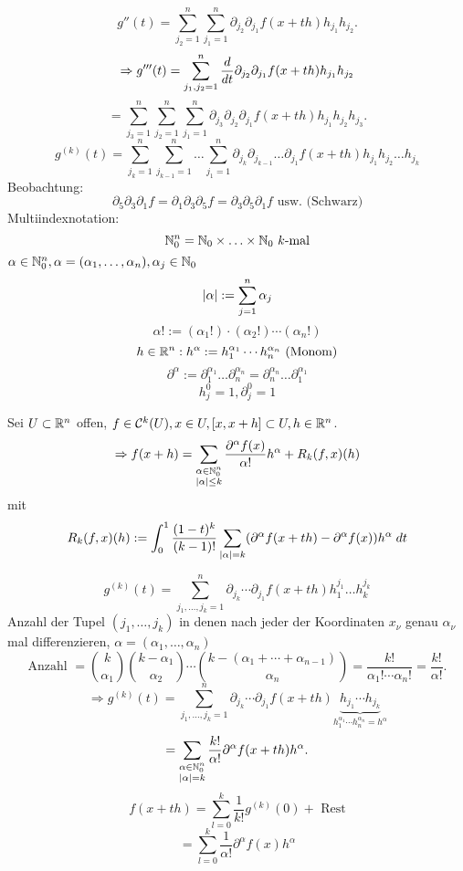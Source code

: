 \documentclass[../ana2.tex]{subfiles}
\begin{document}
\[ g''(t) = \sum_{j_2=1}^n \sum_{j_1=1}^n 
\partial_{j_2} \partial_{j_1} f(x + th) h_{j_1} h_{j_2}. \]
\[ \Rightarrow g'''(t) = \sum_{j_1,j_2 = 1}^n 
\ddx{t} \partial_{j_2} \partial_{j_1} f(x + th) h_{j_1} h_{j_2} \]
\[ = \sum_{j_3 = 1}^n\sum_{j_2 = 1}^n \sum_{j_1=1}^n \partial_{j_3} \partial_{j_2} \partial_{j_1}
f(x + th) h_{j_1} h_{j_2} h_{j_3}. \]
\[ g^{(k)}(t) = \sum_{j_k=1}^n \sum_{j_{k-1}=1}^n \ldots \sum_{j_{1}=1}^n 
\partial_{j_k}\partial_{j_{k-1}}\ldots\partial_{j_1} f(x+th)h_{j_1}h_{j_2}\ldots h_{j_k} \]
Beobachtung: 
\[ \partial_5 \partial_3 \partial_1f  = \partial_1 \partial_3 \partial_5 f
= \partial_3 \partial_5 \partial_1 f \text{ usw. (Schwarz)} \]
Multiindexnotation:
\[ \N_0^n = \N_0 \times \ldots \times \N_0 \ k\text{-mal} \]
\( \alpha \in \N_0^n, \alpha =(\alpha_1, \ldots, \alpha_n), \alpha_j \in \N_0 \)
\[ \abs{\alpha} := \sum_{j=1}^n \alpha_j \]
\[ \alpha! := (\alpha_1!) \cdot (\alpha_2!) \cdots (\alpha_n!) \]
\[ h \in \R^n: h^\alpha := h_1^{\alpha_1} \cdots h_n^{\alpha_n} \text{ (Monom)} \]
\[ \partial^\alpha := \partial_1^{\alpha_1}\ldots \partial_n^{\alpha_n}
= \partial_n^{\alpha_n}\ldots\partial_1^{\alpha_1} \]
\[ h_j^0 = 1, \partial_j^0 = 1 \]
\begin{satz}
    Sei \( U \subset \R^n \) offen, \( f \in \mathcal{C}^k(U), 
    x \in U, [x,x+h] \subset U, h \in \R^n \).
    \[ \Rightarrow f(x + h) = \sum_{\substack{\alpha \in \N_0^n \\ \abs{\alpha} \leq k}} 
    \frac{ \partial^\alpha f(x) }{\alpha!} h^\alpha 
    + R_k(f, x)(h) \]
    mit 
    \[R_k(f,x)(h) := \integralx{\frac{(1-t)^k}{(k-1)!} 
    \sum_{\abs{\alpha} = k} 
    (\partial^\alpha f(x+th)-\partial^\alpha f(x))h^\alpha}{0}{1}{t}\]   
\end{satz}
\begin{bew}
    \[ g^{(k)}(t) = \sum_{j_1,\ldots, j_k = 1}^n 
    \partial_{j_k}\cdots \partial_{j_1} f(x+th)h_1^{j_1}\ldots h_k^{j_k} \]
    Anzahl der Tupel \( (j_1, \ldots, j_k) \) 
    in denen nach jeder der Koordinaten 
    \( x_\nu \) genau \( \alpha_\nu \) mal differenzieren, 
    \( \alpha = (\alpha_1, \ldots, \alpha_n) \) \\
    \[ \text{Anzahl } = \binom{k}{\alpha_1} \binom{k - \alpha_1}{\alpha_2} \cdots 
    \binom{k - (\alpha_1 + \cdots + \alpha_{n-1})}{\alpha_n}
    = \frac{ k! }{\alpha_1! \cdots \alpha_n!} 
    = \frac{k!}{\alpha!}. \]
    \[ \Rightarrow g^{(k)}(t) = \sum_{j_1,\ldots,j_k = 1}^n 
    \partial_{j_k}\cdots\partial_{j_1} f(x+th) 
    \underbrace{h_{j_1}\cdots h_{j_k}}_{h_1^{\alpha_1}\cdots h_n^{\alpha_n} = h^\alpha} \]
    \[ = \sum_{\substack{\alpha \in \N_0^n\\ \abs{\alpha}=k}} \frac{k!}{\alpha!}
    \partial^\alpha f(x+th) h^\alpha. \]
    \[ f(x + th) = \sum_{l=0}^k \frac{1}{k!} g^{(k)}(0) + \text{ Rest} \]
    \[ = \sum_{l=0}^k \frac{1}{\alpha!} \partial^\alpha f(x) h^\alpha \]
\end{bew}
\end{document}
